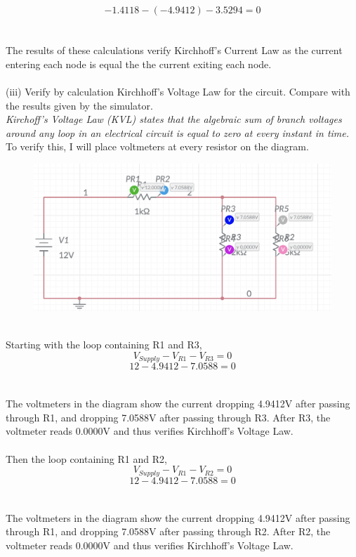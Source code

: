 \documentclass[12pt]{article}
\begin{document}
\[-1.4118 - (-4.9412) - 3.5294 = 0\]\\
\\
The results of these calculations verify Kirchhoff's Current Law as the current entering each node is equal the the current exiting each node.\\
\\
(iii) Verify by calculation Kirchhoff's Voltage Law for the circuit. Compare with the results given by the simulator.\\
\textit{Kirchoff’s Voltage Law (KVL) states that the algebraic sum of branch voltages around any loop in an electrical circuit is equal to zero at every instant in time.}\\
To verify this, I will place voltmeters at every resistor on the diagram.\\
\begin{figure}[!h] 
	\begin{centering}
		\includegraphics[keepaspectratio = true, width = 5in]{Q1(iii).png}
	\end{centering}
\end{figure}\\
Starting with the loop containing R1 and R3,\\
\[V_{Supply} - V_{R1} - V_{R3} = 0\]
\[12 - 4.9412 - 7.0588 = 0\]\\
\\
The voltmeters in the diagram show the current dropping 4.9412V after passing through R1, and dropping 7.0588V after passing through R3. After R3, the voltmeter reads 0.0000V and thus verifies Kirchhoff's Voltage Law.\\
\\
Then the loop containing R1 and R2,\\
\[V_{Supply} - V_{R1} - V_{R2} = 0\]
\[12 - 4.9412 - 7.0588 = 0\]\\
\\
The voltmeters in the diagram show the current dropping 4.9412V after passing through R1, and dropping 7.0588V after passing through R2. After R2, the voltmeter reads 0.0000V and thus verifies Kirchhoff's Voltage Law.\\
\end{document}
